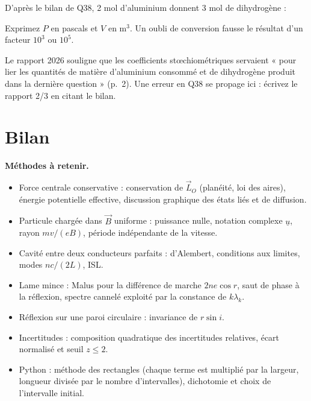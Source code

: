 \documentclass[11pt,a4paper]{article}
\providecommand{\tightlist}{\setlength{\itemsep}{0pt}\setlength{\parskip}{0pt}}
\newcommand{\equationajustee}[1]{%
  \sbox{\boiteequation}{$\displaystyle #1$}%
  \ifdim\wd\boiteequation>\linewidth
    \[\resizebox{\linewidth}{!}{\usebox{\boiteequation}}\]%
  \else
    \[#1\]%
  \fi}
\begin{document}
D'après le bilan de Q38, 2 mol d'aluminium donnent 3 mol de dihydrogène :

\equationajustee{n(\mathrm{A\ell})=\frac23n(\mathrm H_2)\approx0{,}137\ \mathrm{mol}}

\equationajustee{\boxed{m\approx3{,}7\ \mathrm g}}

\begin{piege}

Exprimez \(P\) en pascals et \(V\) en \(\mathrm m^3\). Un oubli de conversion fausse le résultat d'un facteur \(10^3\) ou \(10^5\).

\end{piege}

\begin{jury}

Le rapport 2026 souligne que les coefficients stœchiométriques servaient « pour lier les quantités de matière d'aluminium consommé et de dihydrogène produit dans la dernière question » (p.~2). Une erreur en Q38 se propage ici : écrivez le rapport 2/3 en citant le bilan.

\end{jury}

\hypertarget{bilan}{%
\section{Bilan}\label{bilan}}

\textbf{Méthodes à retenir.}

\begin{itemize}
\tightlist
\item
  Force centrale conservative : conservation de \(\vec L_O\) (planéité, loi des aires), énergie potentielle effective, discussion graphique des états liés et de diffusion.
\item
  Particule chargée dans \(\vec B\) uniforme : puissance nulle, notation complexe \(\underline u\), rayon \(mv/(eB)\), période indépendante de la vitesse.
\item
  Cavité entre deux conducteurs parfaits : d'Alembert, conditions aux limites, modes \(nc/(2L)\), ISL.
\item
  Lame mince : Malus pour la différence de marche \(2ne\cos r\), saut de phase à la réflexion, spectre cannelé exploité par la constance de \(k\lambda_k\).
\item
  Réflexion sur une paroi circulaire : invariance de \(r\sin i\).
\item
  Incertitudes : composition quadratique des incertitudes relatives, écart normalisé et seuil \(z\le2\).
\item
  Python : méthode des rectangles (chaque terme est multiplié par la largeur, longueur divisée par le nombre d'intervalles), dichotomie et choix de l'intervalle initial.
\end{itemize}
\end{document}
